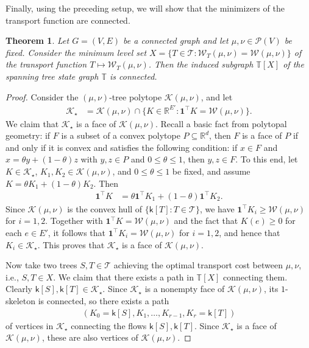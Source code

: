 \documentclass[10pt,a4paper]{amsart}
\newcommand{\prob}{{\mathscr{P}}}
\newcommand{\wass}{{\mathcal{W}}}
\newcommand{\setoftrees}{{\mathcal{T}}}
\newcommand{\stategraph}{{\mathbb{T}}}
\newcommand{\embedding}{{\mathsf{k}}}
\newcommand{\flowpoly}{{\mathcal{K}}}
\newtheorem{theorem}{Theorem}[section]
\begin{document}
    Finally, using the preceding setup, we will show that the minimizers of the transport function are connected.

    \begin{theorem}\label{thm:connectivity-minimizers}
        Let $G=(V,E)$ be a connected graph and let $\mu,\nu\in\prob(V)$ be fixed. Consider the minimum level set $X = \{T\in\setoftrees : \wass_{T}(\mu,\nu) = \wass(\mu,\nu)\}$ of the transport function $T\mapsto \wass_{T}(\mu,\nu)$. Then the induced subgraph $\stategraph[X]$ of the spanning tree state graph $\stategraph$ is connected.
    \end{theorem}

    \begin{proof}
        Consider the $(\mu,\nu)$-tree polytope $\flowpoly(\mu,\nu)$, and let
            \begin{align*}
                \flowpoly_\star &= \flowpoly(\mu,\nu) \cap \{K\in\mathbb{R}^{E'} : \mathbf{1}^\top K = \wass(\mu,\nu)\}.
            \end{align*}
        We claim that $\flowpoly_\star$ is a face of $\flowpoly(\mu,\nu)$. Recall a basic fact from polytopal geometry: if $F$ is a subset of a convex polytope $P\subseteq\mathbb{R}^{d}$, then $F$ is a face of $P$ if and only if it is convex and satisfies the following condition: if $x\in F$ and $x = \theta y + (1-\theta) z$ with $y, z\in P$ and $0\le \theta\le 1$, then $y, z\in F$. To this end, let $K\in\flowpoly_\star$, $K_1, K_2\in\flowpoly(\mu,\nu)$, and $0 \le \theta \le 1$ be fixed, and assume $K = \theta K_1 + (1-\theta) K_2$. Then
            \begin{align*}
                \mathbf{1}^\top K &= \theta \mathbf{1}^\top K_1 + (1-\theta) \mathbf{1}^\top K_2.
            \end{align*}
        Since $\flowpoly(\mu,\nu)$ is the convex hull of $\{\embedding[T]:T\in\setoftrees\}$, we have $\mathbf{1}^\top K_i \ge \wass(\mu,\nu)$ for $i=1,2$. Together with $\mathbf{1}^\top K = \wass(\mu,\nu)$ and the fact that $K(e)\geq 0$ for each $e\in E'$, it follows that $\mathbf{1}^\top K_i = \wass(\mu,\nu)$ for $i=1,2$, and hence that $K_i\in\flowpoly_\star$. This proves that $\flowpoly_\star$ is a face of $\flowpoly(\mu,\nu)$.

        Now take two trees $S, T\in \setoftrees$ achieving the optimal transport cost between $\mu,\nu$, i.e., $S,T\in X$. We claim that there exists a path in $\stategraph[X]$ connecting them. Clearly $\embedding[S], \embedding[T]\in \flowpoly_\star$. Since $\flowpoly_\star$ is a nonempty face of $\flowpoly(\mu,\nu)$, its $1$-skeleton is connected, so there exists a path
            \begin{align*}
                (K_0 = \embedding[S], K_1,\dots, K_{r-1}, K_{r} = \embedding[T])
            \end{align*}
        of vertices in $\flowpoly_\star$ connecting the flows $\embedding[S], \embedding[T]$. Since $\flowpoly_\star$ is a face of $\flowpoly(\mu,\nu)$, these are also vertices of $\flowpoly(\mu,\nu)$.


\end{proof}
\end{document}
